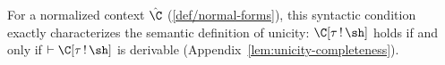 \documentclass[acmsmall,screen,nonacm%
\Anonymous{,anonymous}{}%
\Final{}{,review}%
]{acmart}
\begin{document}
For a normalized context $\hat\C$ (\cref{def/normal-forms}), this syntactic
condition exactly characterizes the semantic definition of unicity: $\Cshape \C
\tau \sh$ holds if and only if $\th \Cshape \C \tau \sh$ is derivable
(Appendix~\cref{lem:unicity-completeness}).

\begin{example}
\begin{local}
\def \xgetx{{\ttlab {getx}}}
\def \xdiag{{\ttlab {diag}}}
\def \elabx{{\ttlab x}}
\def \tvp {{\tv_{\ttlab p}}}
\def \tvpc {{\tvc_{\ttlab p}}}
\def \tvpcp {{\tvc_{\ttlab p}'}}
\def \tvgp {{\tv_{\ttlab {gp}}}}
\def \tvgetx {{\tva_\xgetx}}
\def \tvcgetx {{\tvc_\xgetx}}
\def \tvcpgetx {{\tvc_\xgetx'}}
\def \tvgetxret {\tvc}
\def \tvcgetxret {\tvca}
\def \tvcpgetxret {\tvcb}
\def \tgpoint {\ttlab {gpoint}}
\def \qcommaq {\quad,\quad}
\def \commaq {,\quad}


\end{local}
\end{example}
\end{document}
